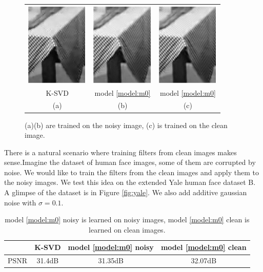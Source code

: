 \documentclass[a4paper]{article}
\begin{document}
\begin{figure}[h!]
\centering
\label{fig:detail}
\begin{tabular}{c c c}
\includegraphics[width=3cm]{./figures/4_7.eps} & \includegraphics[width=3cm]{./figures/4_8.eps} &\includegraphics[width=3cm]{./figures/4_6.eps}\\
K-SVD & model \eqref{model:m0} & model \eqref{model:m0} \\
(a)&(b)&(c)\\
\end{tabular}
\caption{(a)(b) are trained on the noisy image, (c) is trained on the clean image.}
\end{figure}
There is a natural scenario where training filters from clean images makes sense.Imagine the dataset of human face images, some of them are corrupted by noise. We would like to train the filters from the clean images and apply them to the noisy images. We test this idea on the extended Yale human face dataset B. A glimpse of the dataset is in Figure \ref{fig:yale}. We also add additive gaussian noise with $\sigma=0.1$. 
\begin{table}[h!]
\centering
\begin{tabular}{c c c c}
\hline
& K-SVD & model \eqref{model:m0} noisy& model \eqref{model:m0} clean \\
\hline
PSNR& 31.4dB &31.35dB& 32.07dB\\
\hline
\end{tabular}
\caption{model \eqref{model:m0} noisy is learned on noisy images, model \eqref{model:m0} clean is learned on clean images.}
\end{table}
\end{document}
